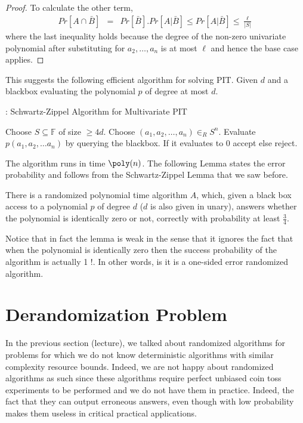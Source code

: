 \begin{proof}
\noindent To calculate the other term,
\begin{eqnarray*}
Pr[A \cap \bar{B}] & = & Pr[\bar{B}].Pr[A|\bar{B}] \le Pr[A|\bar{B}] \le \frac{\ell}{|S|}
\end{eqnarray*}
where the last inequality holds because the degree of the non-zero
univariate polynomial after substituting for $a_2, \ldots, a_n$ is at
most $\ell$ and hence the base case applies.
\end{proof}

This suggests the following efficient algorithm for solving PIT. Given $d$ and a
blackbox evaluating the polynomial $p$ of degree at most $d$.


\begin{algorithm}%
\label{alg:sz-pit}
\caption{: Schwartz-Zippel Algorithm for Multivariate PIT}
\begin{algorithmic}[1]
\State Choose $S \subseteq \mathbb{F}$ of size $\ge 4d$.
\State Choose $(a_1, a_2, \ldots, a_n) \in_R S^n$.
\State Evaluate $p(a_1, a_2, \ldots a_n)$ by querying the blackbox.
\State If it evaluates to 0 accept else reject.
\end{algorithmic}
\end{algorithm}

The algorithm runs in time $\poly(n)$. The following
Lemma states the error probability and follows from the
Schwartz-Zippel Lemma that we saw before.
\begin{lemma}
There is a randomized polynomial time algorithm $A$, which, given a black
box access to a polynomial $p$ of degree $d$ ($d$ is also given in unary), answers whether the polynomial is identically zero or not, correctly
with probability at least $\frac{3}{4}$.
\end{lemma}

Notice that in fact the lemma is weak in the sense that it ignores the fact that when the polynomial is identically zero then the success probability of the algorithm is actually 1 !. In other words, is it is a one-sided error randomized algorithm.


\section{Derandomization Problem}

In the previous section (lecture), we talked about randomized algorithms for problems for which we do not know deterministic algorithms with similar complexity resource bounds. Indeed, we are not happy about randomized algorithms as such since these algorithms require perfect unbiased coin toss experiments to be performed and we do not have them in practice. Indeed, the fact that they can output erroneous answers, even though with low probability makes them useless in critical practical applications.

